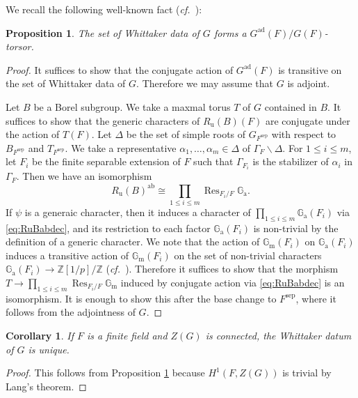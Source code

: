 \documentclass[12pt,a4paper]{article}
\newtheorem{cor}[thm]{Corollary}
\newtheorem{prop}[thm]{Proposition}
\DeclareMathOperator{\ad}{ad}
\DeclareMathOperator{\Res}{Res}
\newcommand{\cf}{\textit{cf.\ }}
\newcommand{\mb}{\mathbb}
\newcommand{\mr}{\mathrm}
\newcommand{\Gm}{\mathbb{G}_{\mathrm{m}}}
\newcommand{\Ga}{\mathbb{G}_{\mathrm{a}}}
\newcommand{\ab}{\mathrm{ab}}
\newcommand{\sep}{\mathrm{sep}}
\begin{document}
We recall the following well-known fact (\cf \cite[\S 3]{DeRegencusp}):

\begin{prop}\label{prop:whitor}
	The set of Whittaker data of $G$ forms a $G^{\ad}(F)/G(F)$-torsor. 
\end{prop}
\begin{proof}
It suffices to show that the conjugate action of $G^{\ad}(F)$ is transitive on the set of Whittaker data of $G$. Therefore we may assume that $G$ is adjoint. 

Let $B$ be a Borel subgroup. We take a maxmal torus $T$ of $G$ contained in $B$. It suffices to show that the generic characters of $R_{\mr{u}}(B)(F)$ are conjugate under the action of $T(F)$. 
Let $\Delta$ be the set of simple roots of $G_{F^{\sep}}$ with respect to $B_{F^{\sep}}$ and $T_{F^{\sep}}$. 
We take a representative $\alpha_1, \ldots , \alpha_m \in \Delta$ of $\Gamma_F \backslash \Delta$. 
For $1 \leq i \leq m$, let $F_i$ be the finite separable extension of $F$ such that $\Gamma_{F_i}$ is the stabilizer of $\alpha_i$ in $\Gamma_F$. Then we have an isomorphism 
\begin{equation}\label{eq:RuBabdec}
R_{\mr{u}}(B)^{\ab} \cong \prod_{1 \leq i \leq m} \Res_{F_i/F} \Ga. 
\end{equation}
If $\psi$ is a generaic character, then it induces a character of $\prod_{1 \leq i \leq m} \Ga (F_i)$ via \eqref{eq:RuBabdec}, and its restriction to each factor $\Ga (F_i)$ is non-trivial by the definition of a generic character. We note that the action of $\Gm (F_i)$ on $\Ga (F_i)$ induces a transitive action of $\Gm (F_i)$ on the set of non-trivial characters $\Ga (F_i) \to \mb{Z}[1/p]/\mb{Z}$ (\cf \cite[1.7 Proposition]{BHLLCGL2}). Therefore it suffices to show that the morphism 
$T \to \prod_{1 \leq i \leq m} \Res_{F_i/F} \Gm$ 
induced by conjugate action via \eqref{eq:RuBabdec} is an isomorphism. It is enough to show this after the base change to $F^{\sep}$, where it follows from the adjointness of $G$.  
\end{proof}

\begin{cor}\label{cor:whuni}
If $F$ is a finite field and $Z(G)$ is connected, the Whittaker datum of $G$ is unique. 
\end{cor}
\begin{proof}
This follows from Proposition \ref{prop:whitor} because 
$H^1(F,Z(G))$ is trivial by Lang's theorem. 
\end{proof}
\end{document}
